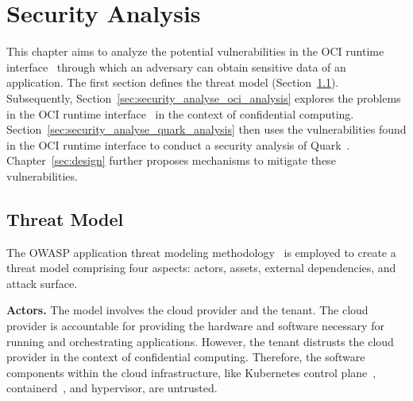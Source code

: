 \chapter{Security Analysis}
\label{sec:security_analyse}




This chapter aims to analyze the potential vulnerabilities in the OCI runtime interface~\cite*{oci-runtime-spec} through which an adversary can obtain sensitive data of an application. The first section defines the threat model (Section~\ref{sec:Threat_model}). Subsequently, Section~\ref{sec:security_analyse_oci_analysis} explores the problems in the OCI runtime interface~\cite*{oci-runtime-spec} in the 
context of confidential computing. Section~\ref{sec:security_analyse_quark_analysis} then uses the vulnerabilities found in the OCI runtime interface to conduct a security analysis of Quark~\cite*{quark}. Chapter~\ref{sec:design} further proposes mechanisms to mitigate these vulnerabilities.


\section{Threat Model}
\label{sec:Threat_model}
The OWASP application threat modeling methodology~\cite*{OWASP_Threat_Modeling} is employed to create a threat model comprising four aspects: actors, assets, external dependencies, and attack surface.

\textbf{Actors.} The model involves the cloud provider and the tenant. The cloud provider is accountable for providing the hardware and software necessary for running and orchestrating applications. However, the tenant distrusts the cloud provider in the 
context of confidential computing. Therefore, the software components within the cloud infrastructure, like Kubernetes control plane~\cite*{k8s}, containerd~\cite*{containerd}, and hypervisor, are untrusted.

